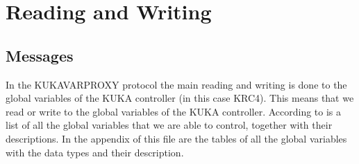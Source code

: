 \section{Reading and Writing}

\subsection{Messages}

In the KUKAVARPROXY protocol the main reading and writing is done to the global variables of the KUKA controller (in this case KRC4).
This means that we read or write to the global variables of the KUKA controller.
According to \cite{openkuka_system_variables} is a list of all the global variables that we are able to control, together with their descriptions.
In the appendix of this file are the tables of all the global variables with the data types and their description.